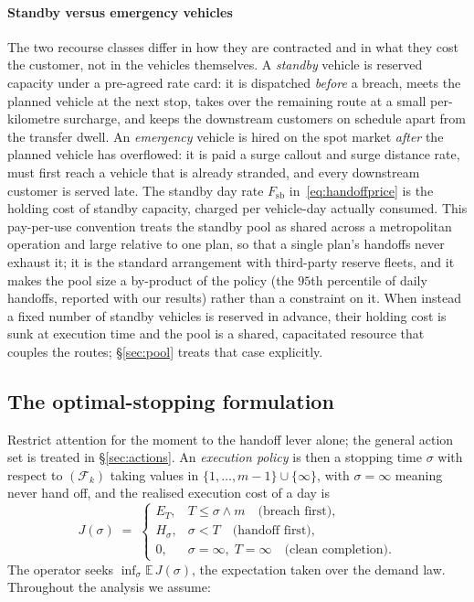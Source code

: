 \documentclass[preprint,authoryear,12pt]{elsarticle}
\theoremstyle{definition}
\theoremstyle{remark}
\begin{document}
\paragraph{Standby versus emergency vehicles} The two recourse classes
differ in how they are contracted and in what they cost the customer,
not in the vehicles themselves. A \emph{standby} vehicle is reserved
capacity under a pre-agreed rate card: it is dispatched
\emph{before} a breach, meets the planned vehicle at the next stop,
takes over the remaining route at a small per-kilometre surcharge, and
keeps the downstream customers on schedule apart from the transfer
dwell. An \emph{emergency} vehicle is hired on the spot market
\emph{after} the planned vehicle has overflowed: it is paid a surge
callout and surge distance rate, must first reach a vehicle that is
already stranded, and every downstream customer is served late. The
standby day rate $F_{\mathrm{sb}}$ in~\eqref{eq:handoffprice} is the
holding cost of standby capacity, charged per vehicle-day actually
consumed. This pay-per-use convention treats the standby pool as shared
across a metropolitan operation and large relative to one plan, so that
a single plan's handoffs never exhaust it; it is the standard
arrangement with third-party reserve fleets, and it makes the pool size
a by-product of the policy (the $95$th percentile of daily handoffs,
reported with our results) rather than a constraint on it. When instead
a fixed number of standby vehicles is reserved in advance, their holding
cost is sunk at execution time and the pool is a shared, capacitated
resource that couples the routes; \S\ref{sec:pool} treats that case
explicitly.

\subsection{The optimal-stopping formulation}\label{sec:formulation}

Restrict attention for the moment to the handoff lever alone; the
general action set is treated in \S\ref{sec:actions}. An
\emph{execution policy} is then a stopping time $\sigma$ with respect to
$(\mathcal F_k)$ taking values in $\{1,\dots,m-1\} \cup \{\infty\}$,
with $\sigma = \infty$ meaning never hand off, and the realised
execution cost of a day is
\begin{equation}\label{eq:cost}
  J(\sigma) \;=\;
  \begin{cases}
    E_T, & T \le \sigma \wedge m \quad\text{(breach first)},\\[2pt]
    H_\sigma, & \sigma < T \quad\text{(handoff first)},\\[2pt]
    0, & \sigma = \infty,\; T = \infty
    \quad\text{(clean completion)} .
  \end{cases}
\end{equation}
The operator seeks $\inf_\sigma \mathbb E\, J(\sigma)$, the expectation
taken over the demand law. Throughout the analysis we assume:
\end{document}
